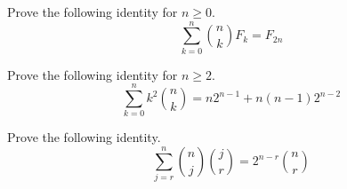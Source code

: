 \documentclass[11pt,letterpaper,boxed]{hmcpset}
\begin{document}
\begin{solution}
    \vfill
\end{solution}

\newpage


\begin{problem}
    Prove the following identity for $n\geq0$.
    $$\sum_{k=0}^n\binom{n}{k}F_k=F_{2n}$$
\end{problem}

\begin{solution}
    \vfill
\end{solution}

\newpage


\begin{problem}
    Prove the following identity for $n\geq2$.
    $$\sum_{k=0}^nk^2\binom{n}{k}=n2^{n-1}+n(n-1)2^{n-2}$$
\end{problem}

\begin{solution}
    \vfill
\end{solution}

\newpage


\begin{problem}
    Prove the following identity.
    $$\sum_{j=r}^n\binom{n}{j}\binom{j}{r}=2^{n-r}\binom{n}{r}$$
\end{problem}

\begin{solution}
    \vfill
\end{solution}

\newpage
\end{document}
